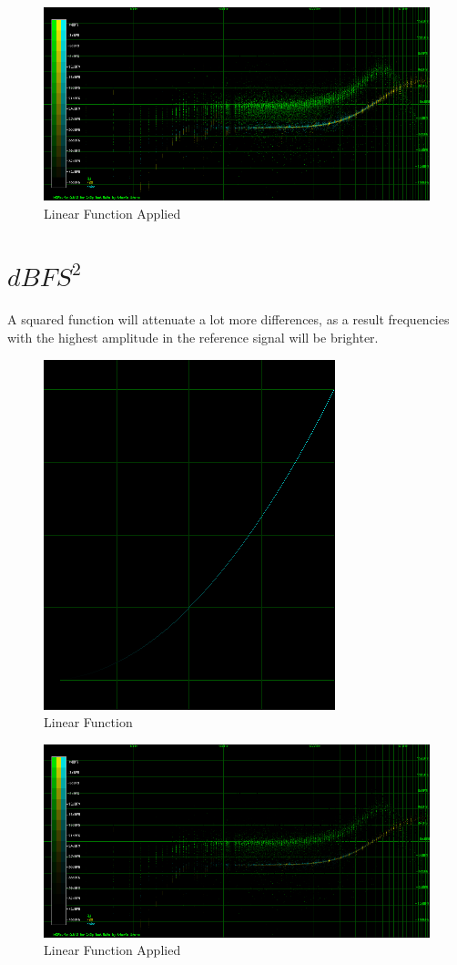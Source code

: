 \documentclass[10pt,a4paper]{report}
\begin{document}
\begin{appendices}
\begin{figure}[H]
	\centering
	\includegraphics[width=1\linewidth]{plots/BetaFunctionPlot_3_Data.png}
	\caption[Linear Applied]{Linear Function Applied}
	\label{fig:betafunctionplot3data}
\end{figure}

\newpage
\section{$dBFS^2$}

A squared function will attenuate a lot more differences, as a result frequencies with the highest amplitude in the reference signal will be brighter.

\begin{figure}[H]
	\centering
	\includegraphics[width=0.4\linewidth]{plots/BetaFunctionPlot_4.png}
	\caption[Linear]{Linear Function}
	\label{fig:betafunctionplot4}
\end{figure}

\begin{figure}[H]
	\centering
	\includegraphics[width=1\linewidth]{plots/BetaFunctionPlot_4_Data.png}
	\caption[Linear Applied]{Linear Function Applied}
	\label{fig:betafunctionplot4data}
\end{figure}


\end{appendices}
\end{document}
